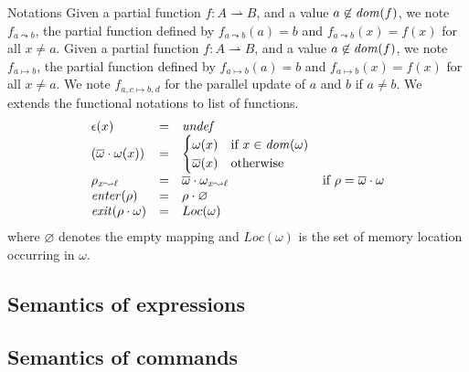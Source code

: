 \begin{paragraph}{Notations}
  Given a partial function $f : A \rightharpoonup B$, and a value $a \not \in {\mathit{dom}}(f)$, we note $f_{a \leadsto b}$, the
  partial function defined by $f_{a\leadsto b}(a) = b$ and $f_{a\leadsto b}(x)=f(x)$ for all $x \not = a$.
  Given a partial function $f : A \rightharpoonup B$, and a value $a \not \in {\mathit{dom}}(f)$, we note $f_{a \mapsto b}$, the
  partial function defined by $f_{a\mapsto b}(a) = b$ and $f_{a\mapsto b}(x)=f(x)$ for all $x \not = a$. We note
  $f_{a,c \mapsto b,d}$ for the parallel update of $a$ and $b$ if $a \not = b$.
  We extends the functional notations to list of functions.
  $$
    \begin{array}{lcll}
      \epsilon(x)                       & = & {\mathit{undef}}                                                                                       \\
      (\overline{\omega}\cdot\omega(x)) & = &
      \begin{cases}
        \omega(x)            & {\text{if $x \in {\mathit{dom}}(\omega)$}} \\
        \overline{\omega}(x) & {\text{otherwise}}
      \end{cases}
      \\
      \rho_{x \leadsto \ell}            & = & \overline{\omega} \cdot \omega_{x \leadsto \ell} & {\text{if $\rho = \overline{\omega} \cdot \omega$}} \\
      {\mathit{enter}}(\rho)                   & = & \rho \cdot \varnothing                                                                                 \\
      {\mathit{exit}}(\rho\cdot\omega)      & = & Loc(\omega)
    \end{array}
  $$
  where $\varnothing$ denotes the empty mapping and $Loc(\omega)$ is
  the set of memory location occurring in $\omega$.
\end{paragraph}


\subsection{Semantics of expressions}


\subsection{Semantics of commands}



